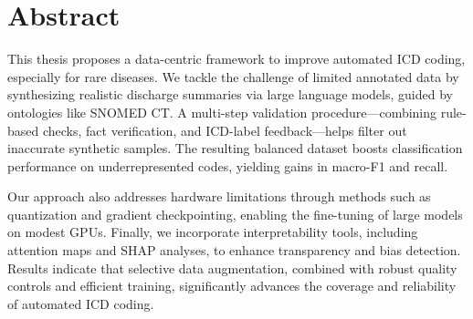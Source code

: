 \chapter*{Abstract}
\begin{doublespacing}
This thesis proposes a data-centric framework to improve automated ICD coding, especially for rare diseases. We tackle the challenge of limited annotated data by synthesizing realistic discharge summaries via large language models, guided by ontologies like SNOMED CT. A multi-step validation procedure—combining rule-based checks, fact verification, and ICD-label feedback—helps filter out inaccurate synthetic samples. The resulting balanced dataset boosts classification performance on underrepresented codes, yielding gains in macro-F1 and recall.  

Our approach also addresses hardware limitations through methods such as quantization and gradient checkpointing, enabling the fine-tuning of large models on modest GPUs. Finally, we incorporate interpretability tools, including attention maps and SHAP analyses, to enhance transparency and bias detection. Results indicate that selective data augmentation, combined with robust quality controls and efficient training, significantly advances the coverage and reliability of automated ICD coding.
\end{doublespacing}
